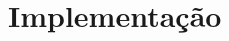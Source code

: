 \newpage
\renewcommand{\thefigure}{M\arabic{figure}}
\renewcommand{\thetable}{M\arabic{table}}
\setcounter{figure}{0}
\section{Implementação}



